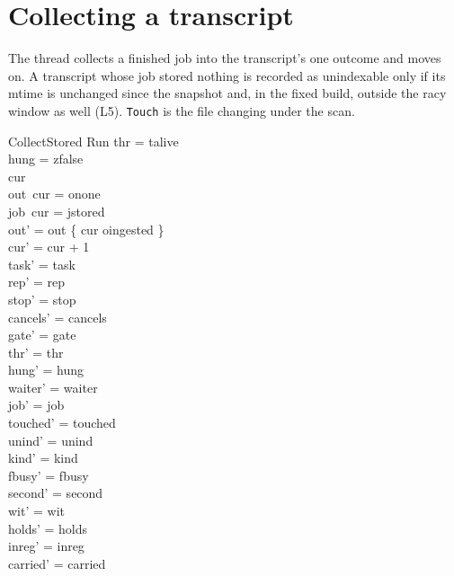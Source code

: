 \documentclass[a4paper,10pt,fleqn]{article}
\newcommand{\field}[1]{\texttt{#1}}
\begin{document}
\section{Collecting a transcript}
\label{sec:collect}

The thread collects a finished job into the transcript's one outcome and moves
on. A transcript whose job stored nothing is recorded as unindexable only if
its mtime is unchanged since the snapshot and, in the fixed build, outside the
racy window as well (L5). \field{Touch} is the file changing under the scan.

\begin{schema}{CollectStored}
\Delta Run
\where
thr = talive \\
hung = zfalse \\
cur   \\
out~cur = onone \\
job~cur = jstored \\
out' = out \oplus \{ cur \mapsto oingested \} \\
cur' = cur + 1 \\
task' = task \\
rep' = rep \\
stop' = stop \\
cancels' = cancels \\
gate' = gate \\
thr' = thr \\
hung' = hung \\
waiter' = waiter \\
job' = job \\
touched' = touched \\
unind' = unind \\
kind' = kind \\
fbusy' = fbusy \\
second' = second \\
wit' = wit \\
holds' = holds \\
inreg' = inreg \\
carried' = carried
\end{schema}
\end{document}
